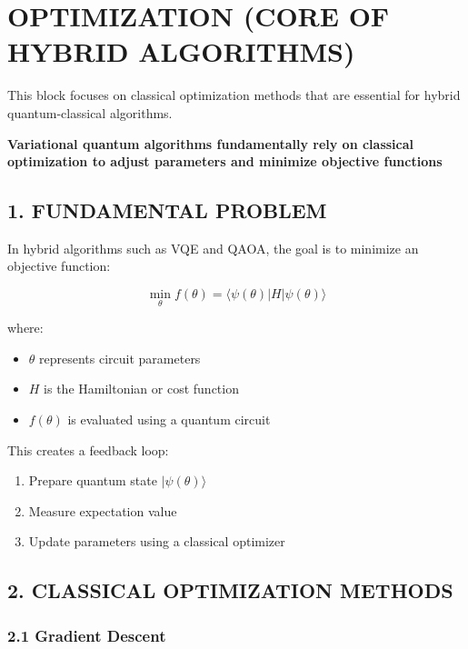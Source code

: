 \chapter{OPTIMIZATION (CORE OF HYBRID ALGORITHMS)}

This block focuses on classical optimization methods that are essential for hybrid quantum-classical algorithms.

\begin{center}
\textbf{Variational quantum algorithms fundamentally rely on classical optimization to adjust parameters and minimize objective functions}
\end{center}

\vspace{0.5cm}

\section*{1. FUNDAMENTAL PROBLEM}

In hybrid algorithms such as VQE and QAOA, the goal is to minimize an objective function:

\[
\min_{\theta} f(\theta) = \langle \psi(\theta) | H | \psi(\theta) \rangle
\]

where:
\begin{itemize}
\item $\theta$ represents circuit parameters
\item $H$ is the Hamiltonian or cost function
\item $f(\theta)$ is evaluated using a quantum circuit
\end{itemize}

This creates a feedback loop:
\begin{enumerate}
\item Prepare quantum state $|\psi(\theta)\rangle$
\item Measure expectation value
\item Update parameters using a classical optimizer
\end{enumerate}

\vspace{0.5cm}

\section*{2. CLASSICAL OPTIMIZATION METHODS}

\subsection*{2.1 Gradient Descent}

